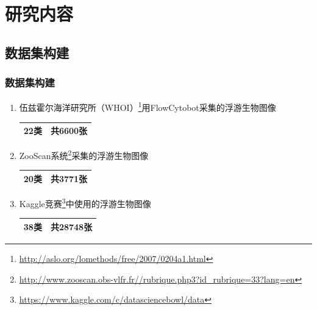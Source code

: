 \documentclass[notheorems,mathserif,table,compress]{beamer}  %
\begin{document}
\section{研究内容}


\subsection{数据集构建}

\begin{frame}
\frametitle{数据集构建}
\begin{enumerate}
\item 伍兹霍尔海洋研究所（WHOI）\footnote{\href{http://aslo.org/lomethods/free/2007/0204a1.html}{http://aslo.org/lomethods/free/2007/0204a1.html}}用FlowCytobot采集的浮游生物图像
\begin{table}
\small
\begin{tabular}[c]{|c|c|}
\hline
22类 & 共6600张\\%
\hline
\end{tabular}
\end{table}

\item ZooScan系统\footnote{\href{http://www.zooscan.obs-vlfr.fr//rubrique.php3?id\_rubrique=33?lang=en}{http://www.zooscan.obs-vlfr.fr//rubrique.php3?id\_rubrique=33?lang=en}}采集的浮游生物图像
\begin{table}
\small
\begin{tabular}[c]{|c|c|}
\hline
20类 & 共3771张\\%
\hline
\end{tabular}
\end{table}

\item Kaggle竞赛\footnote{\href{https://www.kaggle.com/c/datasciencebowl/data}{https://www.kaggle.com/c/datasciencebowl/data}}中使用的浮游生物图像
\begin{table}
\small
\begin{tabular}[c]{|c|c|}
\hline
38类 & 共28748张\\%
\hline
\end{tabular}
\end{table}
\end{enumerate}
\end{frame}
\end{document}
